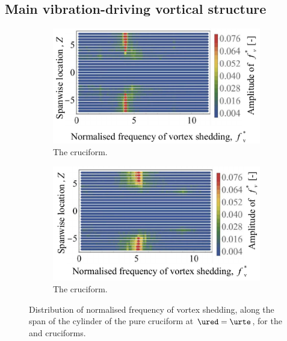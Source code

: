 \documentclass[a4paper,fleqn]{cas-sc}
\begin{document}
\subsection{Main vibration-driving vortical structure}\label{ssec:transitionalRegimeVortStruct}

\begin{figure}
  \centering
  \begin{subfigure}[h]{0.4\textwidth}
    \includegraphics[width=\textwidth]{figs/probe675YU10}
    \caption{The \angfo{} cruciform.}
    \label{fig:probe675YU10}
  \end{subfigure}
  \hspace{6mm}
  \begin{subfigure}[h]{0.4\textwidth}
    \includegraphics[width=\textwidth]{figs/probe45YU10}
    \caption{The \angth{} cruciform.}
    \label{fig:probe45UU10}
  \end{subfigure}

  \caption{Distribution of normalised frequency of vortex shedding, along the span of the cylinder of the pure cruciform at $\ured = \urte$, for the \angfo{} and \angth{} cruciforms.}
  \label{fig:probe67545YU10}
\end{figure}
\end{document}
